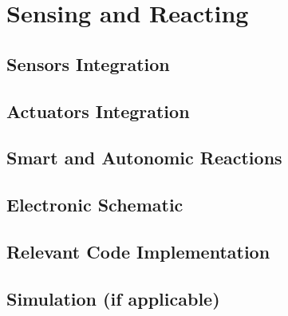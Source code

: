 \section{Sensing and Reacting}
\label{sec:sensing_and_reacting}



\subsection{Sensors Integration}

\subsection{Actuators Integration}

\subsection{Smart and Autonomic Reactions}

\subsection{Electronic Schematic}


\subsection{Relevant Code Implementation}


\subsection{Simulation (if applicable)}

